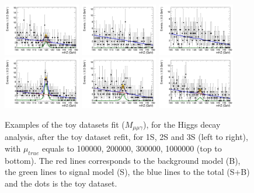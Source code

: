 \begin{figure}[!htbp]
\begin{center}
\includegraphics[width=0.3\textwidth]{figures/modeling_xchecks/plots/HToUpsilon1SPhoton_Cat0_signalStrenght_300000/Cat0_mHZ_fit_s}
\includegraphics[width=0.3\textwidth]{figures/modeling_xchecks/plots/HToUpsilon2SPhoton_Cat0_signalStrenght_300000/Cat0_mHZ_fit_s}
\includegraphics[width=0.3\textwidth]{figures/modeling_xchecks/plots/HToUpsilon3SPhoton_Cat0_signalStrenght_300000/Cat0_mHZ_fit_s}
\includegraphics[width=0.3\textwidth]{figures/modeling_xchecks/plots/HToUpsilon1SPhoton_Cat0_signalStrenght_1000000/Cat0_mHZ_fit_s}
\includegraphics[width=0.3\textwidth]{figures/modeling_xchecks/plots/HToUpsilon2SPhoton_Cat0_signalStrenght_1000000/Cat0_mHZ_fit_s}
\includegraphics[width=0.3\textwidth]{figures/modeling_xchecks/plots/HToUpsilon3SPhoton_Cat0_signalStrenght_1000000/Cat0_mHZ_fit_s}
\end{center}
\caption{Examples of the toy datasets fit ($M_{\mu\mu\gamma}$), for the Higgs decay analysis, after the toy dataset refit, for 1S, 2S and 3S (left to right), with $\mu_{true}$ equals to 100000, 200000, 300000, 1000000 (top to bottom). The red lines corresponds to the background model (B), the green lines to signal model (S), the blue lines to the total (S+B) and the dots is the toy dataset.}
\label{fig:fits_xchecks_mHZ_H}
\end{figure}








